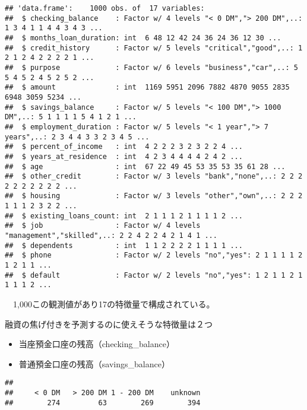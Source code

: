 \documentclass[
]{article}
\newenvironment{Shaded}{\begin{snugshade}}{\end{snugshade}}
\newcommand{\FunctionTok}[1]{\textcolor[rgb]{0.13,0.29,0.53}{\textbf{#1}}}
\newcommand{\NormalTok}[1]{#1}
\newcommand{\SpecialCharTok}[1]{\textcolor[rgb]{0.81,0.36,0.00}{\textbf{#1}}}
\providecommand{\tightlist}{%
  \setlength{\itemsep}{0pt}\setlength{\parskip}{0pt}}
\begin{document}
\begin{verbatim}
## 'data.frame':    1000 obs. of  17 variables:
##  $ checking_balance    : Factor w/ 4 levels "< 0 DM","> 200 DM",..: 1 3 4 1 1 4 4 3 4 3 ...
##  $ months_loan_duration: int  6 48 12 42 24 36 24 36 12 30 ...
##  $ credit_history      : Factor w/ 5 levels "critical","good",..: 1 2 1 2 4 2 2 2 2 1 ...
##  $ purpose             : Factor w/ 6 levels "business","car",..: 5 5 4 5 2 4 5 2 5 2 ...
##  $ amount              : int  1169 5951 2096 7882 4870 9055 2835 6948 3059 5234 ...
##  $ savings_balance     : Factor w/ 5 levels "< 100 DM","> 1000 DM",..: 5 1 1 1 1 5 4 1 2 1 ...
##  $ employment_duration : Factor w/ 5 levels "< 1 year","> 7 years",..: 2 3 4 4 3 3 2 3 4 5 ...
##  $ percent_of_income   : int  4 2 2 2 3 2 3 2 2 4 ...
##  $ years_at_residence  : int  4 2 3 4 4 4 4 2 4 2 ...
##  $ age                 : int  67 22 49 45 53 35 53 35 61 28 ...
##  $ other_credit        : Factor w/ 3 levels "bank","none",..: 2 2 2 2 2 2 2 2 2 2 ...
##  $ housing             : Factor w/ 3 levels "other","own",..: 2 2 2 1 1 1 2 3 2 2 ...
##  $ existing_loans_count: int  2 1 1 1 2 1 1 1 1 2 ...
##  $ job                 : Factor w/ 4 levels "management","skilled",..: 2 2 4 2 2 4 2 1 4 1 ...
##  $ dependents          : int  1 1 2 2 2 2 1 1 1 1 ...
##  $ phone               : Factor w/ 2 levels "no","yes": 2 1 1 1 1 2 1 2 1 1 ...
##  $ default             : Factor w/ 2 levels "no","yes": 1 2 1 1 2 1 1 1 1 2 ...
\end{verbatim}

　1,000この観測値があり17の特徴量で構成されている。

融資の焦げ付きを予測するのに使えそうな特徴量は２つ

\begin{itemize}
\tightlist
\item
  当座預金口座の残高（checking\_balance）
\item
  普通預金口座の残高（savings\_balance）
\end{itemize}

\begin{Shaded}
\end{Shaded}

\begin{verbatim}
## 
##     < 0 DM   > 200 DM 1 - 200 DM    unknown 
##        274         63        269        394
\end{verbatim}
\end{document}
